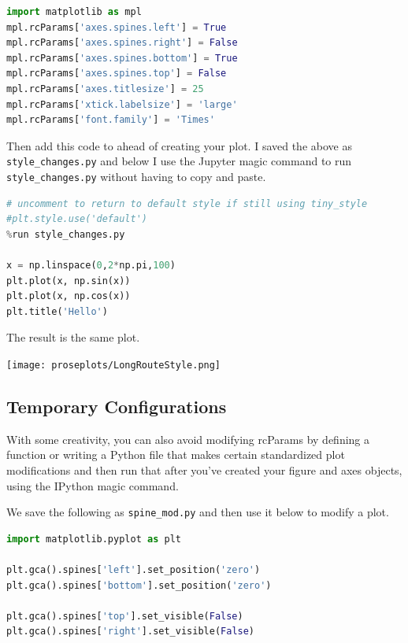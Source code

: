 \begin{lstlisting}[language = Python,
caption = {[style\_changes.py]}]
import matplotlib as mpl
mpl.rcParams['axes.spines.left'] = True
mpl.rcParams['axes.spines.right'] = False
mpl.rcParams['axes.spines.bottom'] = True
mpl.rcParams['axes.spines.top'] = False
mpl.rcParams['axes.titlesize'] = 25
mpl.rcParams['xtick.labelsize'] = 'large'
mpl.rcParams['font.family'] = 'Times'
\end{lstlisting}

Then add this code to ahead of creating your plot. I saved the above as \texttt{style\_changes.py} and below I use the Jupyter  magic command to run \texttt{style\_changes.py} without having to copy and paste. 
\begin{lstlisting}[language = Python]
# uncomment to return to default style if still using tiny_style
#plt.style.use('default')
%run style_changes.py

x = np.linspace(0,2*np.pi,100)
plt.plot(x, np.sin(x))
plt.plot(x, np.cos(x))
plt.title('Hello')
\end{lstlisting}

The result is the same plot. 

\begin{center}
    \texttt{[image: proseplots/LongRouteStyle.png]}
\end{center}

\subsection{Temporary Configurations}


With some creativity, you can also avoid modifying rcParams by defining a function or writing a Python file that makes certain standardized plot modifications and then run that after you've created your figure and axes objects, using the IPython  magic command. 

We save the following as \texttt{spine\_mod.py} and then use it below to modify a plot. 


\begin{lstlisting}[language = Python,caption = {[spine\_mod.py]}]
import matplotlib.pyplot as plt 

plt.gca().spines['left'].set_position('zero')
plt.gca().spines['bottom'].set_position('zero')

plt.gca().spines['top'].set_visible(False)
plt.gca().spines['right'].set_visible(False)
\end{lstlisting}


